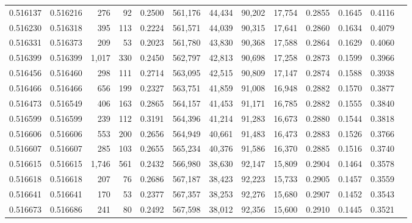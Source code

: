 \begin{tabular}{rrrrrrrrrrrrr}
0.516137 & 0.516216 &   276 &    92 &                                     0.2500 & 561,176 &  44,434 &  90,202 &  17,754 & 0.2855 & 0.1645 & 0.4116 \\
0.516230 & 0.516318 &   395 &   113 &                                     0.2224 & 561,571 &  44,039 &  90,315 &  17,641 & 0.2860 & 0.1634 & 0.4079 \\
0.516331 & 0.516373 &   209 &    53 &                                     0.2023 & 561,780 &  43,830 &  90,368 &  17,588 & 0.2864 & 0.1629 & 0.4060 \\
0.516399 & 0.516399 & 1,017 &   330 &                                     0.2450 & 562,797 &  42,813 &  90,698 &  17,258 & 0.2873 & 0.1599 & 0.3966 \\
0.516456 & 0.516460 &   298 &   111 &                                     0.2714 & 563,095 &  42,515 &  90,809 &  17,147 & 0.2874 & 0.1588 & 0.3938 \\
0.516466 & 0.516466 &   656 &   199 &                                     0.2327 & 563,751 &  41,859 &  91,008 &  16,948 & 0.2882 & 0.1570 & 0.3877 \\
0.516473 & 0.516549 &   406 &   163 &                                     0.2865 & 564,157 &  41,453 &  91,171 &  16,785 & 0.2882 & 0.1555 & 0.3840 \\
0.516599 & 0.516599 &   239 &   112 &                                     0.3191 & 564,396 &  41,214 &  91,283 &  16,673 & 0.2880 & 0.1544 & 0.3818 \\
0.516606 & 0.516606 &   553 &   200 &                                     0.2656 & 564,949 &  40,661 &  91,483 &  16,473 & 0.2883 & 0.1526 & 0.3766 \\
0.516607 & 0.516607 &   285 &   103 &                                     0.2655 & 565,234 &  40,376 &  91,586 &  16,370 & 0.2885 & 0.1516 & 0.3740 \\
0.516615 & 0.516615 & 1,746 &   561 &                                     0.2432 & 566,980 &  38,630 &  92,147 &  15,809 & 0.2904 & 0.1464 & 0.3578 \\
0.516618 & 0.516618 &   207 &    76 &                                     0.2686 & 567,187 &  38,423 &  92,223 &  15,733 & 0.2905 & 0.1457 & 0.3559 \\
0.516641 & 0.516641 &   170 &    53 &                                     0.2377 & 567,357 &  38,253 &  92,276 &  15,680 & 0.2907 & 0.1452 & 0.3543 \\
0.516673 & 0.516686 &   241 &    80 &                                     0.2492 & 567,598 &  38,012 &  92,356 &  15,600 & 0.2910 & 0.1445 & 0.3521 \\

\end{tabular}
